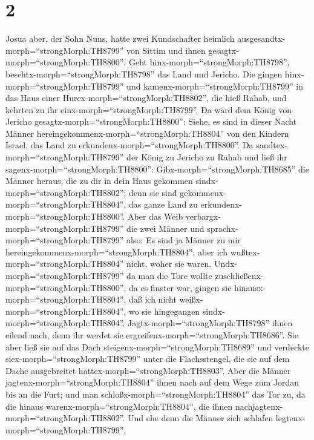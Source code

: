 \hypertarget{section-1}{%
\section{2}\label{section-1}}

 Josua aber, der Sohn Nuns, hatte zwei Kundschafter heimlich
ausgesandtx-morph=``strongMorph:TH8799'' von Sittim und ihnen
gesagtx-morph=``strongMorph:TH8800'': Geht
hinx-morph=``strongMorph:TH8798'', besehtx-morph=``strongMorph:TH8798''
das Land und Jericho. Die gingen hinx-morph=``strongMorph:TH8799'' und
kamenx-morph=``strongMorph:TH8799'' in das Haus einer
Hurex-morph=``strongMorph:TH8802'', die hieß Rahab, und kehrten zu ihr
einx-morph=``strongMorph:TH8799''.  Da ward dem König von
Jericho gesagtx-morph=``strongMorph:TH8800'': Siehe, es sind in dieser
Nacht Männer hereingekommenx-morph=``strongMorph:TH8804'' von den
Kindern Israel, das Land zu erkundenx-morph=``strongMorph:TH8800''.
 Da sandtex-morph=``strongMorph:TH8799'' der König zu
Jericho zu Rahab und ließ ihr sagenx-morph=``strongMorph:TH8800'':
Gibx-morph=``strongMorph:TH8685'' die Männer heraus, die zu dir in dein
Haus gekommen sindx-morph=``strongMorph:TH8802''; denn sie sind
gekommenx-morph=``strongMorph:TH8804'', das ganze Land zu
erkundenx-morph=``strongMorph:TH8800''.  Aber das Weib
verbargx-morph=``strongMorph:TH8799'' die zwei Männer und
sprachx-morph=``strongMorph:TH8799'' also: Es sind ja Männer zu mir
hereingekommenx-morph=``strongMorph:TH8804''; aber ich
wußtex-morph=``strongMorph:TH8804'' nicht, woher sie waren. 
Undx-morph=``strongMorph:TH8799'' da man die Tore wollte
zuschließenx-morph=``strongMorph:TH8800'', da es finster war, gingen sie
hinausx-morph=``strongMorph:TH8804'', daß ich nicht
weißx-morph=``strongMorph:TH8804'', wo sie hingegangen
sindx-morph=``strongMorph:TH8804''. Jagtx-morph=``strongMorph:TH8798''
ihnen eilend nach, denn ihr werdet sie
ergreifenx-morph=``strongMorph:TH8686''.  Sie aber ließ sie
auf das Dach steigenx-morph=``strongMorph:TH8689'' und verdeckte
siex-morph=``strongMorph:TH8799'' unter die Flachsstengel, die sie auf
dem Dache ausgebreitet hattex-morph=``strongMorph:TH8803''. 
Aber die Männer jagtenx-morph=``strongMorph:TH8804'' ihnen nach auf dem
Wege zum Jordan bis an die Furt; und man
schloßx-morph=``strongMorph:TH8804'' das Tor zu, da die hinaus
warenx-morph=``strongMorph:TH8804'', die ihnen
nachjagtenx-morph=``strongMorph:TH8802''.  Und ehe denn die
Männer sich schlafen legtenx-morph=``strongMorph:TH8799'',
